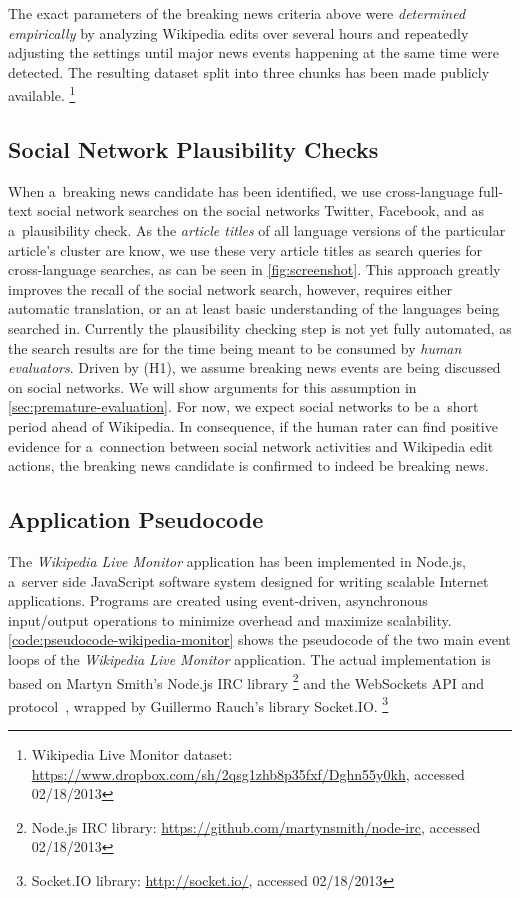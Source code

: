 The exact parameters of the breaking news criteria above
were \emph{determined empirically} by analyzing Wikipedia edits
over several hours and repeatedly adjusting the settings until
major news events happening at the same time were detected.
The resulting dataset split into three chunks has been made publicly available.%
\footnote{Wikipedia Live Monitor dataset: \url{https://www.dropbox.com/sh/2qsg1zhb8p35fxf/Dghn55y0kh},
accessed 02/18/2013}

\subsection{Social Network Plausibility Checks}

When a~breaking news candidate has been identified,
we use cross-language full-text social network searches 
on the social networks Twitter, Facebook, and \googleplus
as a~plausibility check.
As the \emph{article titles} of all language versions
of the particular article's cluster are know,
we use these very article titles as search queries for cross-language searches,
as can be seen in \autoref{fig:screenshot}.
This approach greatly improves the recall of the social network search,
however, requires either automatic translation, or an at least basic understanding
of the languages being searched in.
Currently the plausibility checking step is not yet fully automated,
as the search results are for the time being meant to be consumed by \emph{human evaluators}.
Driven by (H1), we assume breaking news events are being discussed on social networks.
We will show arguments for this assumption in \autoref{sec:premature-evaluation}.
For now, we expect social networks to be a~short period ahead of Wikipedia.
In consequence, if the human rater can find positive evidence
for a~connection between social network activities and Wikipedia edit actions,
the breaking news candidate is confirmed to indeed be breaking news.

\subsection{Application Pseudocode}

The \emph{Wikipedia Live Monitor} application has been implemented in Node.js,
a~server side JavaScript software system
designed for writing scalable Internet applications.
Programs are created using event-driven, asynchronous input/output operations
to minimize overhead and maximize scalability.
\autoref{code:pseudocode-wikipedia-monitor} shows the pseudocode of the two main event loops of the
\emph{Wikipedia Live Monitor} application.
The actual implementation is based on 
Martyn Smith's Node.js IRC library%
\footnote{Node.js IRC library: \url{https://github.com/martynsmith/node-irc},
accessed 02/18/2013} and
the WebSockets API and protocol~\cite{hickson2012websockets},
wrapped by  Guillermo Rauch's library Socket.IO.%
\footnote{Socket.IO library: \url{http://socket.io/},
accessed 02/18/2013}


